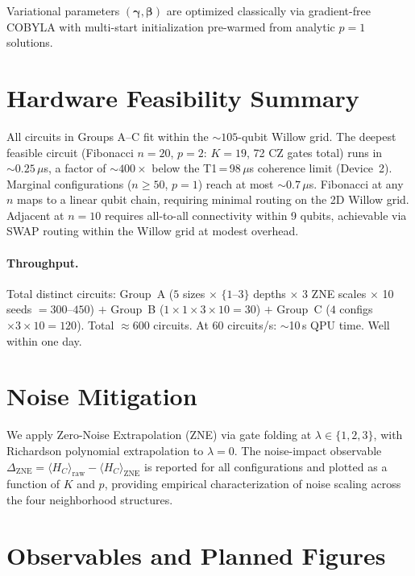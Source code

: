 \documentclass[11pt,a4paper]{article}
\begin{document}
Variational parameters $(\boldsymbol\gamma, \boldsymbol\beta)$ are
optimized classically via gradient-free COBYLA with multi-start
initialization pre-warmed from analytic $p=1$ solutions.

\section*{Hardware Feasibility Summary}

All circuits in Groups A--C fit within the ${\sim}105$-qubit Willow grid.
The deepest feasible circuit (Fibonacci $n=20$, $p=2$: $K=19$, 72 CZ
gates total) runs in ${\sim}0.25\,\mu$s, a factor of ${\sim}400\times$
below the T1\,=\,98\,$\mu$s coherence limit (Device~2). Marginal
configurations ($n \ge 50$, $p=1$) reach at most ${\sim}0.7\,\mu$s.
Fibonacci at any $n$ maps to a linear qubit chain, requiring minimal
routing on the 2D Willow grid. Adjacent at $n=10$ requires all-to-all
connectivity within 9 qubits, achievable via SWAP routing within the
Willow grid at modest overhead.

\paragraph{Throughput.}
Total distinct circuits: Group~A ($5$ sizes $\times$ $\{1\text{--}3\}$
depths $\times$ 3 ZNE scales $\times$ 10 seeds $= 300$--$450$) $+$
Group~B ($1\times1\times3\times10 = 30$) $+$ Group~C ($4$ configs
$\times3\times10 = 120$). Total $\approx600$ circuits. At 60 circuits/s:
$\sim$10\,s QPU time. Well within one day.

\section*{Noise Mitigation}

We apply Zero-Noise Extrapolation (ZNE) via gate folding at
$\lambda \in \{1, 2, 3\}$, with Richardson polynomial extrapolation
to $\lambda=0$. The noise-impact observable
$\Delta_{\text{ZNE}} = \langle H_C\rangle_{\text{raw}} -
\langle H_C\rangle_{\text{ZNE}}$
is reported for all configurations and plotted as a function of $K$ and
$p$, providing empirical characterization of noise scaling across the
four neighborhood structures.

\section*{Observables and Planned Figures}
\end{document}
